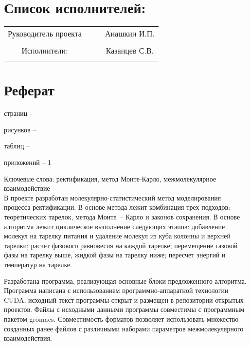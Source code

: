 \section*{Список исполнителей:}
\normalsize{ 
	\begin{tabular}{cccc}
		Руководитель проекта & \hspace{3cm} &  \underline{\hspace{3cm}} & Анашкин И.П. \\\\
		\hfill \break
		Исполнители: &  & \underline{\hspace{3cm}} & Казанцев С.В. \\\\
	\end{tabular}
\thispagestyle{empty} %

\newpage
\section*{Реферат}
страниц -- 

рисунков -- 

таблиц -- 

приложений -- 1 %

Ключевые слова: ректификация, метод Монте-Карло, межмолекулярное взаимодействие
\\

В проекте разработан молекулярно-статистический метод моделирования процесса ректификации. В основе метода лежит комбинация трех подходов: теоретических тарелок, метода Монте~-- Карло и законов сохранения. В основе алгоритма лежит циклическое выполнение следующих этапов: добавление молекул на тарелку питания и удаление молекул из куба колонны и верхней тарелки; расчет фазового равновесия на каждой тарелке; перемещение газовой фазы на тарелку выше, жидкой фазы на тарелку ниже; пересчет энергий и температур на тарелке.

Разработана программа, реализующая основные блоки предложенного алгоритма. Программа написана с использованием программно-аппаратной технологии CUDA, исходный текст программы открыт и размещен в репозитории открытых проектов. Файлы с исходными данными программы совместимы с программным пакетом gromacs. Совместимость форматов позволяет использовать множество созданных ранее файлов с различными наборами параметров межмолекулярного взаимодействия.

}
